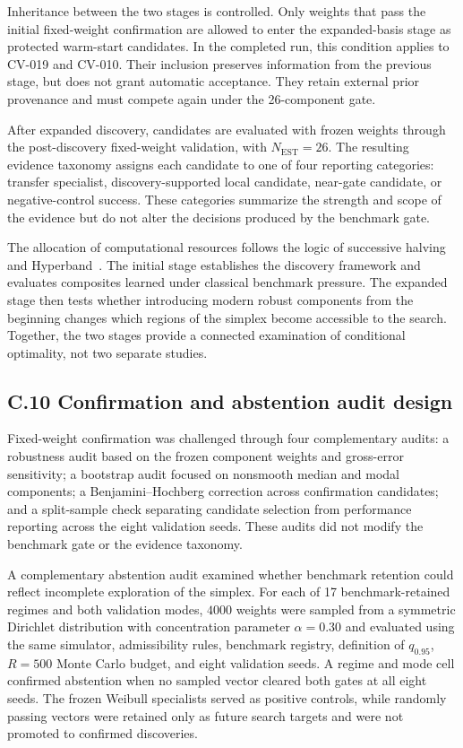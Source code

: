 Inheritance between the two stages is controlled. Only weights that pass the initial fixed-weight confirmation are allowed to enter the expanded-basis stage as protected warm-start candidates. In the completed run, this condition applies to CV-019 and CV-010. Their inclusion preserves information from the previous stage, but does not grant automatic acceptance. They retain external prior provenance and must compete again under the 26-component gate.

After expanded discovery, candidates are evaluated with frozen weights through the post-discovery fixed-weight validation, with $N_{\mathrm{EST}}=26$. The resulting evidence taxonomy assigns each candidate to one of four reporting categories: transfer specialist, discovery-supported local candidate, near-gate candidate, or negative-control success. These categories summarize the strength and scope of the evidence but do not alter the decisions produced by the benchmark gate.

The allocation of computational resources follows the logic of successive halving and Hyperband~\citep{jamieson2016nonstochastic,li2017hyperband}. The initial stage establishes the discovery framework and evaluates composites learned under classical benchmark pressure. The expanded stage then tests whether introducing modern robust components from the beginning changes which regions of the simplex become accessible to the search. Together, the two stages provide a connected examination of conditional optimality, not two separate studies.

\subsection*{C.10 Confirmation and abstention audit design}
Fixed-weight confirmation was challenged through four complementary audits: a robustness audit based on the frozen component weights and gross-error sensitivity; a bootstrap audit focused on nonsmooth median and modal components; a Benjamini--Hochberg correction across confirmation candidates; and a split-sample check separating candidate selection from performance reporting across the eight validation seeds. These audits did not modify the benchmark gate or the evidence taxonomy.

A complementary abstention audit examined whether benchmark retention could reflect incomplete exploration of the simplex. For each of 17 benchmark-retained regimes and both validation modes, $4000$ weights were sampled from a symmetric Dirichlet distribution with concentration parameter $\alpha=0.30$ and evaluated using the same simulator, admissibility rules, benchmark registry, definition of $q_{0.95}$, $R=500$ Monte Carlo budget, and eight validation seeds. A regime and mode cell confirmed abstention when no sampled vector cleared both gates at all eight seeds. The frozen Weibull specialists served as positive controls, while randomly passing vectors were retained only as future search targets and were not promoted to confirmed discoveries.

